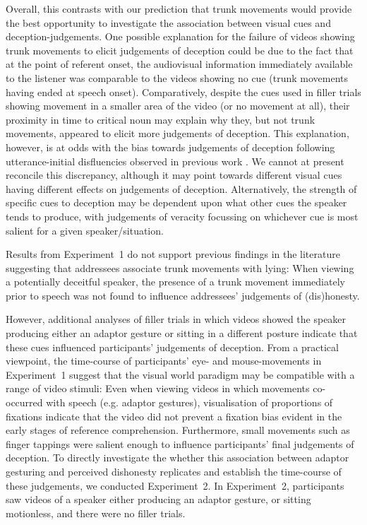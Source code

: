 \documentclass[a4paper,man,natbib]{apa6}
\begin{document}
Overall, this contrasts with our prediction that trunk movements would provide the best opportunity to investigate the association between visual cues and deception-judgements.
One possible explanation for the failure of videos showing trunk movements to elicit judgements of deception could be due to the fact that at the point of referent onset, the audiovisual information immediately available to the listener was comparable to the videos showing no cue (trunk movements having ended at speech onset).
Comparatively, despite the cues used in filler trials showing movement in a smaller area of the video (or no movement at all), their proximity in time to critical noun may explain why they, but not trunk movements, appeared to elicit more judgements of deception. %
This explanation, however, is at odds with the bias towards judgements of deception following utterance-initial disfluencies observed in previous work \citep[][Experiment~1]{Loy2017}.
We cannot at present reconcile this discrepancy, although it may point towards different visual cues having different effects on judgements of deception.
Alternatively, the strength of specific cues to deception may be dependent upon what other cues the speaker tends to produce, with judgements of veracity focussing on whichever cue is most salient for a given speaker/situation. %

Results from Experiment~1 do not support previous findings in the literature suggesting that addressees associate trunk movements with lying: When viewing a potentially deceitful speaker, the presence of a trunk movement immediately prior to speech was not found to influence addressees' judgements of (dis)honesty. 

However, additional analyses of filler trials in which videos showed the speaker producing either an adaptor gesture or sitting in a different posture indicate that these cues influenced participants' judgements of deception. 
From a practical viewpoint, the time-course of participants' eye- and mouse-movements in Experiment~1 suggest that the visual world paradigm may be compatible with a range of video stimuli: Even when viewing videos in which movements co-occurred with speech (e.g. adaptor gestures), visualisation of proportions of fixations indicate that the video did not prevent a fixation bias evident in the early stages of reference comprehension.
Furthermore, small movements such as finger tappings were salient enough to influence participants' final judgements of deception.
To directly investigate the whether this association between adaptor gesturing and perceived dishonesty replicates and establish the time-course of these judgements, we conducted Experiment~2.
In Experiment~2, participants saw videos of a speaker either producing an adaptor gesture, or sitting motionless, and there were no filler trials.
\end{document}
